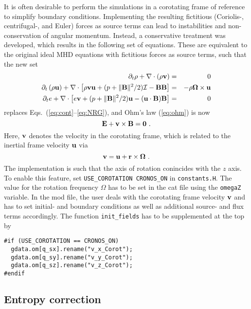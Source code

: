 It is often desirable to perform the simulations in a corotating frame of
reference to simplify boundary conditions. Implementing the resulting
fictitious (Coriolis-, centrifugal-, and Euler) forces as source terms
can lead to instabilities and non-conservation of angular momentum. Instead,
a conservative treatment was developed, which results in the following set of
equations. These are equivalent to the original ideal MHD equations with
fictitious forces as source terms, such that the new set
\begin{eqnarray}
  \partial_t \rho + \nabla \cdot \left( \rho {\bf v} \right) &=& 0 \\
  \partial_t \left( \rho {\bf u} \right)
  + \nabla \cdot \left[ \rho {\bf v u} 
    + (p + \|{\bf B}\|^2/2 ) {\cal I}-{\bf B B} \right]
  &=& -\rho{\bf \Omega}\times{\bf u} \\
  \partial_t e + \nabla \cdot \left[e {\bf v} + (p+\|{\bf B}\|^2/2){\bf u}
    - ({\bf u} \cdot {\bf B}) {\bf B} \right] &=& 0
\end{eqnarray}
replaces Eqs.~(\ref{eq:cont}--\ref{eq:NRG}), and Ohm's law (\ref{eq:ohm})
is now
\begin{equation}
  {\bf E} + {\bf v} \times {\bf B} = {\bf 0} \ .
\end{equation}
Here, ${\bf v}$ denotes the velocity in the corotating frame, which is
related to the inertial frame velocity ${\bf u}$ via
\begin{equation}
  {\bf v} = {\bf u} + {\bf r} \times {\bf \Omega} \ . 
\end{equation}
The implementation is such that the axis of rotation conincides with the
$z$ axis. To enable this feature, set {\tt USE\_COROTATION CRONOS\_ON} in
{\tt constants.H}. The value for the rotation frequency $\Omega$ has to be
set in the cat file using the {\tt omegaZ} variable. In the mod file, the
user deals with the corotating frame velocity ${\bf v}$ and has to set
initial- and boundary conditions as well as additional source- and flux
terms accordingly. The function {\tt init\_fields} has to be supplemented
at the top by
\begin{verbatim}
#if (USE_COROTATION == CRONOS_ON)
  gdata.om[q_sx].rename("v_x_Corot");
  gdata.om[q_sy].rename("v_y_Corot");
  gdata.om[q_sz].rename("v_z_Corot");
#endif
\end{verbatim}

\subsection{Entropy correction}
\label{sect:entropy}


